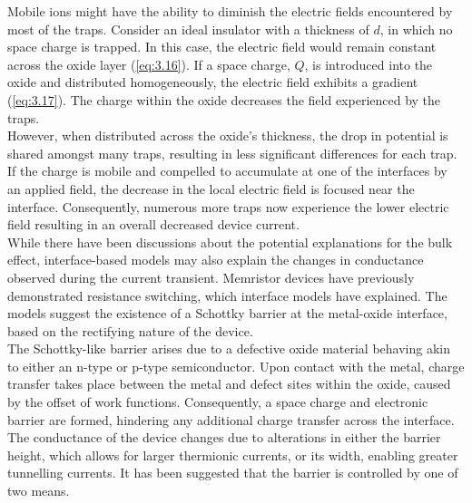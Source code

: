 \noindent Mobile ions might have the ability to diminish the electric fields encountered by most of the traps. Consider an ideal insulator with a thickness of $d$, in which no space charge is trapped. In this case, the electric field would remain constant across the oxide layer (\ref{eq:3.16}). If a space charge, $Q$, is introduced into the oxide and distributed homogeneously, the electric field exhibits a gradient (\ref{eq:3.17}). The charge within the oxide decreases the field experienced by the traps.\\

\noindent However, when distributed across the oxide's thickness, the drop in potential is shared amongst many traps, resulting in less significant differences for each trap. If the charge is mobile and compelled to accumulate at one of the interfaces by an applied field, the decrease in the local electric field is focused near the interface. Consequently, numerous more traps now experience the lower electric field resulting in an overall decreased device current.\\

\noindent While there have been discussions about the potential explanations for the bulk effect, interface-based models may also explain the changes in conductance observed during the current transient. Memristor devices have previously demonstrated resistance switching, which interface models have explained. The models suggest the existence of a Schottky barrier at the metal-oxide interface, based on the rectifying nature of the device.\\

\noindent The Schottky-like barrier arises due to a defective oxide material behaving akin to either an n-type \cite{fujii2005hysteretic} or p-type \cite{sawa2004hysteretic} semiconductor. Upon contact with the metal, charge transfer takes place between the metal and defect sites within the oxide, caused by the offset of work functions. Consequently, a space charge and electronic barrier are formed, hindering any additional charge transfer across the interface. The conductance of the device changes due to alterations in either the barrier height, which allows for larger thermionic currents, or its width, enabling greater tunnelling currents. It has been suggested that the barrier is controlled by one of two means.\\

